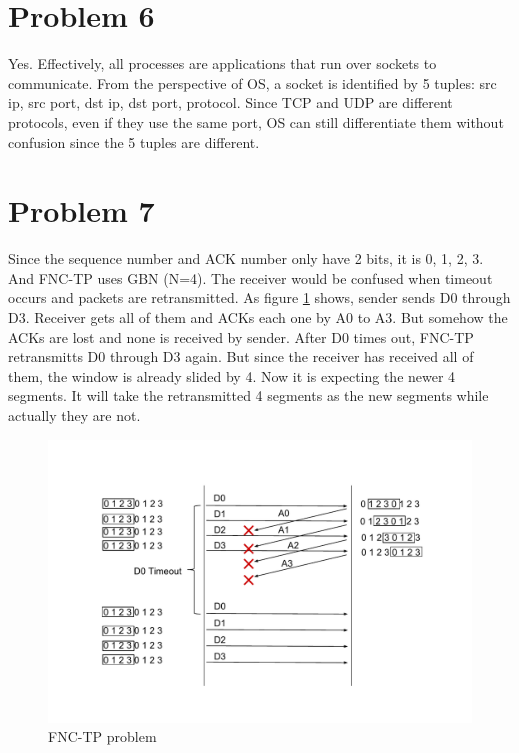 \documentclass[titlepage, paper=a4, fontsize=11pt]{scrartcl} %
\numberwithin{equation}{section} %
\numberwithin{table}{section} %
\begin{document}

\section*{Problem 6}
Yes. Effectively, all processes are applications that run over sockets to communicate. From the perspective of OS, a socket is identified by 5 tuples: src ip, src port, dst ip, dst port, protocol. Since TCP and UDP are different protocols, even if they use the same port, OS can still differentiate them without confusion since the 5 tuples are different.
\\



\section*{Problem 7}
Since the sequence number and ACK number only have 2 bits, it is 0, 1, 2, 3. And FNC-TP uses GBN (N=4). The receiver would be confused when timeout occurs and packets are retransmitted. As figure \ref{fig:P7} shows, sender sends D0 through D3. Receiver gets all of them and ACKs each one by A0 to A3. But somehow the ACKs are lost and none is received by sender. After D0 times out, FNC-TP retransmitts D0 through D3 again. But since the receiver has received all of them, the window is already slided by 4. Now it is expecting the newer 4 segments. It will take the retransmitted 4 segments as the new segments while actually they are not.
\begin{figure}[!ht]
    \includegraphics[width=\textwidth]{images/P7.pdf}
    \caption{FNC-TP problem}
    \label{fig:P7}
\end{figure}
\end{document}
